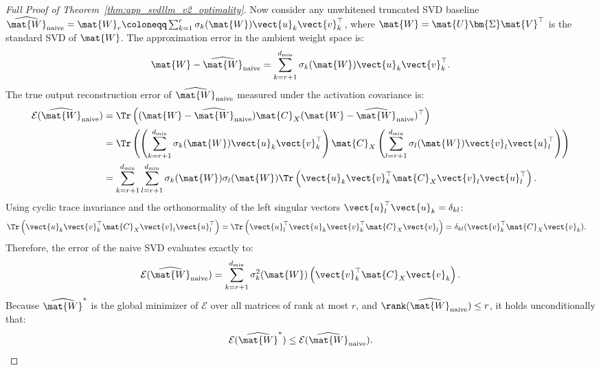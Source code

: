 \begin{proof}[Full Proof of Theorem~\ref{thm:app_svdllm_v2_optimality}]
Now consider any unwhitened truncated SVD baseline $\widehat{\mat{W}}_{\text{naive}} = \mat{W}_r \coloneqq \sum_{k=1}^r \sigma_k(\mat{W}) \vect{u}_k \vect{v}_k^\top$, where $\mat{W} = \mat{U} \bm{\Sigma} \mat{V}^\top$ is the standard SVD of $\mat{W}$.
The approximation error in the ambient weight space is:
\begin{equation}
\mat{W} - \widehat{\mat{W}}_{\text{naive}} = \sum_{k=r+1}^{d_{\min}} \sigma_k(\mat{W}) \vect{u}_k \vect{v}_k^\top.
\end{equation}
The true output reconstruction error of $\widehat{\mat{W}}_{\text{naive}}$ measured under the activation covariance is:
\begin{align}
\mathcal{E}(\widehat{\mat{W}}_{\text{naive}}) &= \Tr\left( (\mat{W} - \widehat{\mat{W}}_{\text{naive}}) \mat{C}_X (\mat{W} - \widehat{\mat{W}}_{\text{naive}})^\top \right) \nonumber \\
&= \Tr\left( \left(\sum_{k=r+1}^{d_{\min}} \sigma_k(\mat{W}) \vect{u}_k \vect{v}_k^\top\right) \mat{C}_X \left(\sum_{l=r+1}^{d_{\min}} \sigma_l(\mat{W}) \vect{v}_l \vect{u}_l^\top\right) \right) \nonumber \\
&= \sum_{k=r+1}^{d_{\min}} \sum_{l=r+1}^{d_{\min}} \sigma_k(\mat{W}) \sigma_l(\mat{W}) \Tr\left( \vect{u}_k \vect{v}_k^\top \mat{C}_X \vect{v}_l \vect{u}_l^\top \right).
\end{align}
Using cyclic trace invariance and the orthonormality of the left singular vectors $\vect{u}_l^\top \vect{u}_k = \delta_{kl}$:
\begin{align}
\Tr\left( \vect{u}_k \vect{v}_k^\top \mat{C}_X \vect{v}_l \vect{u}_l^\top \right) &= \Tr\left( \vect{u}_l^\top \vect{u}_k \vect{v}_k^\top \mat{C}_X \vect{v}_l \right) = \delta_{kl} (\vect{v}_k^\top \mat{C}_X \vect{v}_k).
\end{align}
Therefore, the error of the naive SVD evaluates exactly to:
\begin{equation}
\mathcal{E}(\widehat{\mat{W}}_{\text{naive}}) = \sum_{k=r+1}^{d_{\min}} \sigma_k^2(\mat{W}) \left( \vect{v}_k^\top \mat{C}_X \vect{v}_k \right).
\label{eq:naive_svd_error_expansion}
\end{equation}
Because $\widehat{\mat{W}}^*$ is the global minimizer of $\mathcal{E}$ over all matrices of rank at most $r$, and $\rank(\widehat{\mat{W}}_{\text{naive}}) \le r$, it holds unconditionally that:
\begin{equation}
\mathcal{E}(\widehat{\mat{W}}^*) \le \mathcal{E}(\widehat{\mat{W}}_{\text{naive}}).
\end{equation}

\end{proof}
